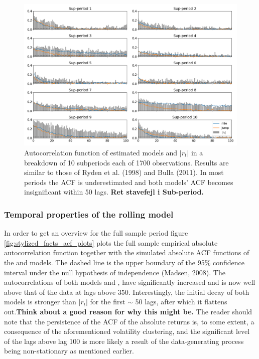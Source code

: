 \begin{figure}[H] 
    \centering
    \includegraphics[width=1.0\textwidth]{analysis/stylized_facts/images/acf_abs_subperiods.png}
    \caption[Autocorrelation function of estimated models and $|r_t|$ on subsamples]{Autocorrelation function of estimated models and $|r_t|$ in a breakdown of 10 subperiods each of 1700 observations. Results are similar to those of Ryden et al. (1998) and Bulla (2011). In most periods the ACF is underestimated and both models' ACF becomes insignificant within 50 lags. \textbf{Ret stavefejl i Sub-period.}}
    \label{fig:stylized_facts_acf_plots_sub_periods} 
\end{figure}

\subsubsection{Temporal properties of the rolling model}

In order to get an overview for the full sample period figure \ref{fig:stylized_facts_acf_plots} plots the full sample empirical absolute autocorrelation function together with the simulated absolute ACF functions of the \mle and \jump models. The dashed line is the upper boundary of the 95\% confidence interval under the null hypothesis of independence (Madsen, 2008). The autocorrelations of both models \mle and \jump, have significantly increased and is now well above that of the data at lags above 350. Interestingly, the initial decay of both models is stronger than $|r_t|$ for the first $\sim$ 50 lags, after which it flattens out.\textbf{Think about a good reason for why this might be.}
The reader should note that the persistence of the ACF of the absolute returns is, to some extent, a consequence of the aforementioned volatility clustering, and the significant level of the lags above lag 100 is more likely a result of the data-generating process being non-stationary as mentioned earlier. 

